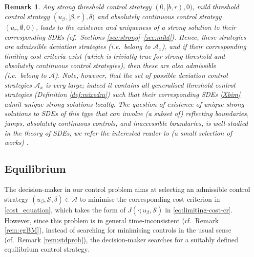 \documentclass[11pt]{article} %
\newtheorem{remark}[theorem]{Remark}
\numberwithin{komcounter}{section}
\begin{document}
\begin{remark}
\label{rem:SDEexist}
Any strong threshold control strategy $(0,[b,r),0)$, mild threshold control strategy  $(u_\beta,[\beta,r),\delta)$ and absolutely continuous control strategy $(u_r,\emptyset,0)$, leads to the existence and uniqueness of a strong solution to their corresponding SDEs (cf.~Sections \ref{sec:strong}--\ref{sec:mild}). 
Hence, these strategies are admissible deviation strategies (i.e.~belong to $\mathcal{A}_x$), and if their corresponding limiting cost criteria exist (which is trivially true for strong threshold and absolutely continuous control strategies), then these are also admissible (i.e.~belong to $\mathcal{A}$). 
Note, however, that the set of possible deviation control strategies $\mathcal{A}_x$ is very large; indeed it contains all generalised threshold control strategies (Definition \ref{def:mixedm}) such that their corresponding SDEs \eqref{Xbim} admit unique strong solutions locally. The question of existence of unique strong solutions to SDEs of this type that can involve (a subset of) reflecting boundaries, jumps, absolutely continuous controls, and inaccessible boundaries, is well-studied in the theory of SDEs; we refer the interested reader to (a small selection of works)
\cite{
bass2007pathwise,
bass2005one,
blei2013one,
blei2013note,
dupuis1993sdes,
oksendal2019applied,
tanaka1979stochastic,
yang2023strong}.
\end{remark}







\subsection{Equilibrium}
\label{sec:NE}

The decision-maker in our control problem aims at selecting an 
admissible control strategy $(u_\beta,\mathcal{S},\delta) \in \mathcal{A}$ to minimise the corresponding cost criterion in \eqref{cost_equation}, which takes the form of $J(\cdot; u_\beta, \mathcal{S})$ in \eqref{eq:limiting-cost-cr}. 
However, since this problem is in general time-inconsistent (cf.~Remark \ref{rem:egBM}), 
instead of searching for minimising controls in the usual sense (cf.~Remark \ref{rem:stdprob}), the decision-maker searches for a suitably defined equilibrium control strategy.
 
\end{document}
